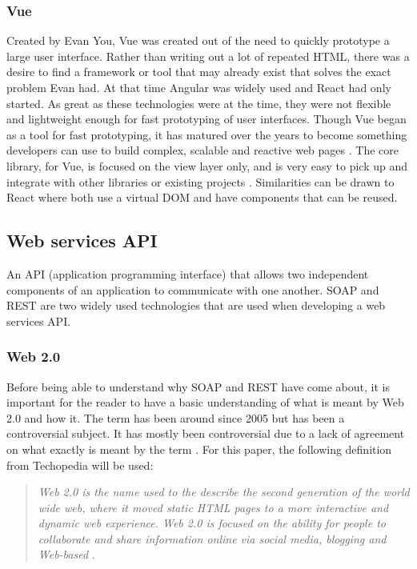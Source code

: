 \subsubsection{Vue}
Created by Evan You, Vue was created out of the need to quickly prototype a large user interface.
Rather than writing out a lot of repeated HTML, there was a desire to find a framework or tool that may already exist that solves the exact problem Evan had.
At that time Angular was widely used and React had only started. As great as these technologies were at the time, they were not flexible and lightweight
enough for fast prototyping of user interfaces. Though Vue began as a tool for fast prototyping, it has matured over the
years to become something developers can use to build complex, scalable and reactive web pages \cite{filipova2016learning}.
The core library, for Vue, is focused on the view layer only, and is very easy to pick up and integrate with other libraries or existing projects \cite{koetsier2016evaluation}.
Similarities can be drawn to React where both use a virtual DOM and have components that can be reused.

\subsection{Web services API} \label{web services}
An API (application programming interface) that allows two independent components of an application to communicate with one another.
SOAP and REST are two widely used technologies that are used when developing a web services API.

\subsubsection{Web 2.0}
Before being able to understand why SOAP and REST have come about, it is important for the reader to have a basic understanding of what is meant by Web 2.0 and how it.
The term has been around since 2005 but has been a controversial subject. It has mostly been controversial due to a lack of agreement on what exactly is meant
by the term \cite{constantinides2008web}. For this paper, the following definition from Techopedia will be used:
\begin{quotation}
    \noindent
    \textit{
        Web 2.0 is the name used to the describe the second generation of the world wide web, where it moved static HTML pages to a more interactive and 
        dynamic web experience.
        Web 2.0 is focused on the ability for people to collaborate and share information online via social media, blogging and Web-based
    }
    \cite{web2definition}. 
\end{quotation} 

